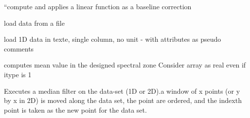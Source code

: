 \documentclass[letterpaper,10pt,openany,oneside]{sphinxmanual}
\begin{document}
\begin{fulllineitems}
\begin{fulllineitems}
\end{fulllineitems}


\begin{fulllineitems}
\label{rst/code:NPKData.NPKData.linear_interpolate}
``compute and applies a linear function as a baseline correction

\end{fulllineitems}


\begin{fulllineitems}
\label{rst/code:NPKData.NPKData.load}
load data from a file

\end{fulllineitems}


\begin{fulllineitems}
\label{rst/code:NPKData.NPKData.load_txt}
load 1D data in texte, single column, no unit - with attributes as pseudo comments

\end{fulllineitems}


\begin{fulllineitems}
\label{rst/code:NPKData.NPKData.mean}
computes mean value  in the designed spectral zone
Consider array as real even if itype is 1

\end{fulllineitems}


\begin{fulllineitems}
\label{rst/code:NPKData.NPKData.median}
Executes a median filter on the data-set (1D or 2D).a window of x 
points (or y by x in 2D) is moved along the data set, the point are 
ordered, and the indexth point is taken as the new point for the 
data set.

\end{fulllineitems}



\end{fulllineitems}
\end{document}
